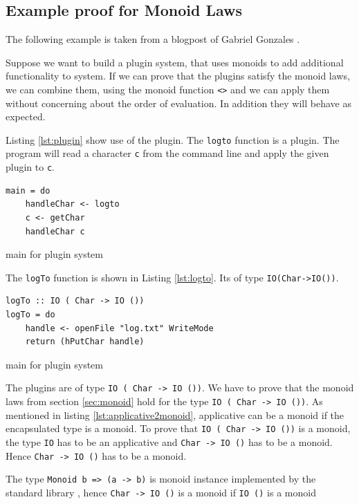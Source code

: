 \documentclass[twoside, a4paper, 12pt]{article}
\begin{document}
\subsection{Example proof for Monoid Laws}
\label{sec:example}

The following example is taken from a blogpost of Gabriel Gonzales \cite{gonzales14}. 

Suppose we want to build a plugin system, that uses monoids to add additional functionality to system. If we can prove that the plugins satisfy the monoid laws, we can combine them, using the monoid function \verb|<>| and we can apply them without concerning about the order of evaluation. In addition they will behave as expected. 

Listing \ref{lst:plugin} show use of the plugin. The \verb|logto| function is a plugin. The program will read a character \verb|c| from the command line and apply the given plugin to \verb|c|.

\begin{program}
\begin{verbatim}
main = do
    handleChar <- logto
    c <- getChar
    handleChar c
\end{verbatim}
\label{lst:plugin}
\caption{main for plugin system}
\end{program}

The \verb|logTo| function is shown in Listing \ref{lst:logto}. Its of type \verb|IO(Char->IO())|. 

\begin{program}
\begin{verbatim}
logTo :: IO ( Char -> IO ())
logTo = do
    handle <- openFile "log.txt" WriteMode
    return (hPutChar handle)
\end{verbatim}
\label{lst:logto}
\caption{main for plugin system}
\end{program}

The plugins are of type \verb|IO ( Char -> IO ())|. We have to  prove that the monoid laws from section \ref{sec:monoid} hold for the type \verb|IO ( Char -> IO ())|.
As mentioned in listing \ref{lst:applicative2monoid}, applicative can be a monoid if the encapsulated type is a monoid. To prove that \verb|IO ( Char -> IO ())| is a monoid, the type \verb|IO| has to be an applicative and \verb|Char -> IO ()| has to be a monoid. Hence \verb|Char -> IO ()| has to be a monoid.

The type \verb|Monoid b => (a -> b)| is monoid instance implemented by the standard library \cite{monoid}, hence \verb|Char -> IO ()| is a monoid if \verb|IO ()| is a monoid
\end{document}
